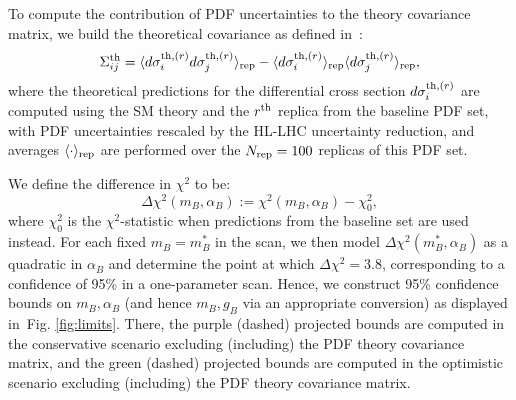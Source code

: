 \documentclass[withindex,glossary]{cam-thesis}
\begin{document}
To compute the contribution of PDF uncertainties to the theory
covariance matrix, we build the theoretical covariance as defined in~\cite{Hartland:2019bjb}:
\begin{equation}
\Sigma^{\rm th}_{ij} = \langle d\sigma_i^{{\rm th},(r)} d\sigma_j^{{\rm th},(r)}\rangle_{\rm rep} - \langle d\sigma_i^{{\rm th},(r)}\rangle_{\rm rep} \langle d\sigma_j^{{\rm th},(r)}\rangle_{\rm rep},
\end{equation}
where the theoretical predictions for the differential cross section $d\sigma_i^{{\rm th},(r)}$ are computed using the SM theory and the $r^{\rm th}$
replica from the baseline PDF set, with PDF uncertainties rescaled by
the HL-LHC uncertainty reduction, and averages $\langle \cdot \rangle_{\rm rep}$ are performed over the 
$N_{\rm rep} = 100$ replicas of this PDF set.

We define the difference in $\chi^2$ to be:
\begin{equation}
\Delta \chi^2(m_B, \alpha_B) := \chi^2(m_B, \alpha_B) - \chi^2_0,
\end{equation}
where $\chi^2_0$ is the $\chi^2$-statistic when predictions from the baseline set are used instead. For each fixed $m_B = m_B^*$ in the scan, we then model $\Delta \chi^2(m_B^*,\alpha_B)$ as a quadratic in $\alpha_B$ and determine the point at which $\Delta \chi^2 = 3.8$, corresponding to a confidence of 95\% in a one-parameter scan. Hence, we construct 95\% confidence bounds on $m_B, \alpha_B$ (and hence $m_B, g_B$ via an appropriate conversion) as displayed in~Fig. \ref{fig:limits}. There, the purple (dashed) projected bounds are computed in the conservative scenario excluding (including) the PDF theory covariance matrix, and the green (dashed) projected bounds are computed in the optimistic scenario excluding (including) the PDF theory covariance matrix.
\end{document}
